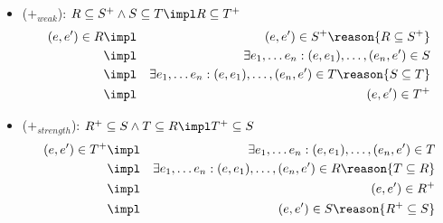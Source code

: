 \begin{itemize}
\begin{eqnarray*}
&\impl & (e_1,e_3) \in R'.R \reason{R'.R \subseteq S} \\
&\impl & (e_1,e_3) \in S
\end{eqnarray*}
\item ($+_{weak}$): $R \subseteq S^+ \land S \subseteq T \impl R \subseteq T^+$
\begin{eqnarray*}
(e,e') \in R &\impl & (e,e') \in S^+ \reason{R \subseteq S^+} \\
&\impl & \exists e_1,\dots e_n:(e,e_1),\dots ,(e_n,e') \in S \\
&\impl & \exists e_1,\dots e_n:(e,e_1),\dots ,(e_n,e') \in T \reason{S \subseteq T} \\
&\impl & (e,e') \in T^+
\end{eqnarray*}
\item ($+_{strength}$): $R^+ \subseteq S \land T \subseteq R \impl T^+ \subseteq S$
\begin{eqnarray*}
(e,e') \in T^+ &\impl & \exists e_1,\dots e_n:(e,e_1),\dots ,(e_n,e') \in T \\
&\impl & \exists e_1,\dots e_n:(e,e_1),\dots ,(e_n,e') \in R \reason{T \subseteq R} \\
&\impl & (e,e') \in R^+ \\
&\impl & (e,e') \in S \reason{R^+ \subseteq S}

\end{eqnarray*}
\end{itemize}
